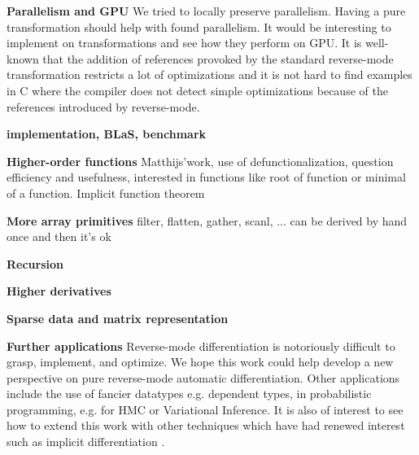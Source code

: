 \noindent \textbf{Parallelism and GPU}
We tried to locally preserve parallelism. Having a pure transformation should help with found parallelism. 
It would be interesting to implement on transformations and see how they perform on GPU.
It is well-known that the addition of references provoked by the standard reverse-mode transformation
restricts a lot of optimizations and it is not hard to find examples in C where the compiler does not detect simple optimizations 
because of the references introduced by reverse-mode.

\noindent \textbf{implementation, BLaS, benchmark}

\noindent \textbf{Higher-order functions}
Matthijs'work, use of defunctionalization, question efficiency and usefulness, 
interested in functions like root of function or minimal of a function. Implicit function theorem

\noindent \textbf{More array primitives}
filter, flatten, gather, scanl, ...
can be derived by hand once and then it's ok

\noindent \textbf{Recursion}

\noindent \textbf{Higher derivatives}

\noindent \textbf{Sparse data and matrix representation}

\noindent \textbf{Further applications}
Reverse-mode differentiation is notoriously difficult to grasp, implement, and optimize.
We hope this work could help develop a new perspective on pure reverse-mode automatic differentiation.
Other applications include the use of fancier datatypes e.g. dependent types, 
in probabilistic programming, e.g. for HMC or Variational Inference. 
It is also of interest to see how to extend this work with other techniques which 
have had renewed interest such as implicit differentiation \cite{blondel2021efficient,lorraine2020optimizing}.



\clearpage